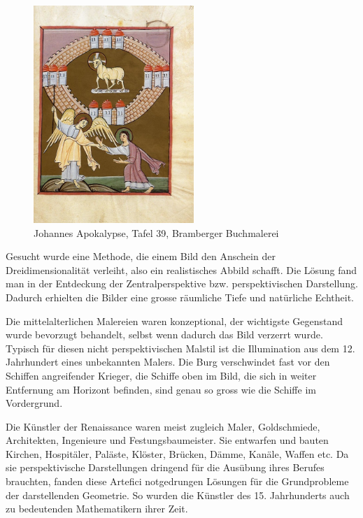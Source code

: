 \documentclass[%
11pt,%
twoside,%
titlepage,%
german,%
headsepline%
]{scrartcl}
\begin{document}
\begin{figure}[h!]
\begin{center}
\includegraphics[width=0.54\textwidth]{pictures/tafel39}
\caption{Johannes Apokalypse, Tafel 39, Bramberger Buchmalerei}
\end{center}
\end{figure}

Gesucht wurde eine Methode, die einem Bild den Anschein der Dreidimensionalit\"at verleiht, also ein realistisches Abbild schafft. Die L\"osung fand man in der Entdeckung der Zentralperspektive bzw. perspektivischen Darstellung. Dadurch erhielten die Bilder eine grosse r\"aumliche Tiefe und nat\"urliche Echtheit.

Die mittelalterlichen Malereien waren \glqq konzeptional\grqq, der wichtigste Gegenstand wurde bevorzugt behandelt, selbst wenn dadurch das Bild verzerrt wurde. Typisch f\"ur diesen nicht perspektivischen Malstil ist die Illumination aus dem 12. Jahrhundert eines unbekannten Malers. Die Burg verschwindet fast vor den Schiffen angreifender Krieger, die Schiffe oben im Bild, die sich in weiter Entfernung am Horizont befinden, sind genau so gross wie die Schiffe im Vordergrund.

Die K\"unstler der Renaissance waren meist zugleich Maler, Goldschmiede, Architekten, Ingenieure und Festungsbaumeister. Sie entwarfen und bauten Kirchen, Hospit\"aler, Pal\"aste, Kl\"oster, Br\"ucken, D\"amme, Kan\"ale, Waffen etc. Da sie perspektivische Darstellungen dringend f\"ur die Aus\"ubung ihres Berufes brauchten, fanden diese Artefici notgedrungen L\"osungen f\"ur die Grundprobleme der darstellenden Geometrie. So wurden die K\"unstler des 15. Jahrhunderts auch zu bedeutenden Mathematikern ihrer Zeit.
\end{document}
